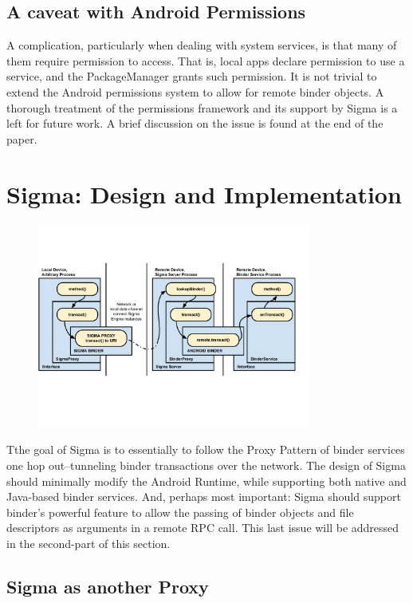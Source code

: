 \documentclass[prodmode]{acmlarge}
\begin{document}
\subsection{A caveat with Android Permissions}
A complication, particularly when dealing with system services, is that many of them require permission to access. That is, local apps declare permission to use a service, and the PackageManager grants such permission. It is not trivial to extend the Android permissions system to allow for remote binder objects. A thorough treatment of the permissions framework and its support by Sigma is a left for future work. A brief discussion on the issue is found at the end of the paper.

\section{Sigma: Design and Implementation}
\begin{figure}[h]
\centering
\includegraphics[width=0.8\textwidth]{drawings/sigma_proxy_pattern.pdf}
\end{figure}
Tthe goal of Sigma is to essentially to follow the Proxy Pattern of binder services one hop out--tunneling binder transactions over the network. The design of Sigma should minimally modify the Android Runtime, while supporting both native and Java-based binder services. And, perhaps most important: Sigma should support binder's powerful feature to allow the passing of binder objects and file descriptors as arguments in a remote RPC call. This last issue will be addressed in the second-part of this section.

\subsection{Sigma as another Proxy}
\end{document}
